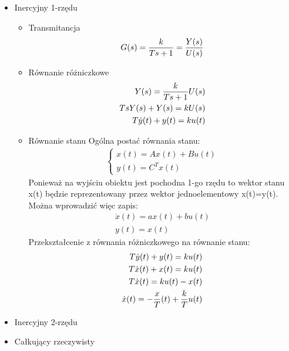 \documentclass[a4paper,10pt]{article}
\begin{document}
\begin{itemize}
\item Inercyjny 1-rzędu

\begin{itemize}
\item Transmitancja	
	\begin{eqnarray}
		G(s)= {k \over {Ts + 1}} = {Y(s) \over U(s)}
	\end{eqnarray}
\item Równanie różniczkowe
	\begin{eqnarray}
		Y(s) = {k \over {Ts + 1}} U(s)\\
		\nonumber TsY(s) + Y(s) = kU(s)\\
		\nonumber T\dot{y}(t) + y(t) = ku(t)
	\end{eqnarray}
\item Równanie stanu
\newline Ogólna postać równania stanu: %
	\begin{eqnarray}
		\left\{
			\begin{array}{l}
				x(t) = Ax(t) + Bu(t)\\
				y(t) = C^{T}x(t)
			\end{array} \right.
	\end{eqnarray}
Ponieważ na wyjściu obiektu jest pochodna 1-go rzędu to wektor stanu x(t) będzie reprezentowany przez wektor jednoelementowy x(t)=y(t). Można wprowadzić więc zapis:
	\begin{eqnarray}
		\dot{x}(t) = ax(t) + bu(t)\\
		\nonumber y(t) = x(t)
	\end{eqnarray}
Przekształcenie z równania różniczkowego na równanie stanu: %
	\begin{eqnarray}
		T\dot{y}(t) + y(t) = ku(t)\\
		\nonumber T\dot{x}(t) + x(t) = ku(t)\\
		\nonumber T\dot{x}(t) = ku(t) - x(t)\\
		\nonumber \dot{x}(t) = -{x \over T}(t) + {k \over T}u(t)
	\end{eqnarray}
\end{itemize}

\item Inercyjny 2-rzędu

\item Całkujący rzeczywisty


\end{itemize}
\end{document}
